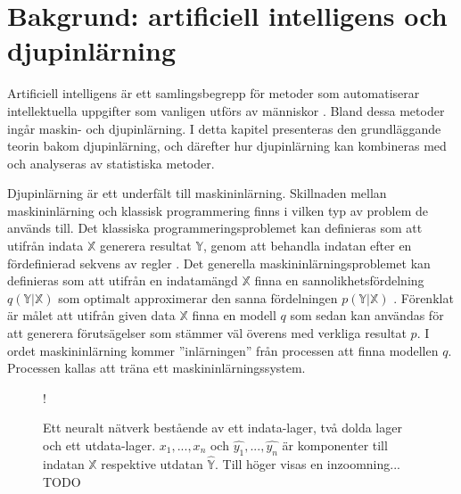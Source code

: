 

\section{Bakgrund: artificiell intelligens och djupinlärning}
\label{sec:DeepBack}

Artificiell intelligens är ett samlingsbegrepp för metoder som automatiserar intellektuella uppgifter som vanligen utförs av människor \cite{Chollet}. Bland dessa metoder ingår maskin- och djupinlärning. I detta kapitel presenteras den grundläggande teorin bakom djupinlärning, och därefter hur djupinlärning kan kombineras med och analyseras av statistiska metoder. 

Djupinlärning är ett underfält till maskininlärning. Skillnaden mellan maskininlärning och klassisk programmering finns i vilken typ av problem de används till. Det klassiska programmeringsproblemet kan definieras som att utifrån indata $\mathbb{X}$ generera resultat $\mathbb{Y}$, genom att behandla indatan efter en fördefinierad sekvens av regler \cite{JavaGroundUp}. Det generella maskininlärningsproblemet kan definieras som att utifrån en indatamängd $\mathbb{X}$ finna en sannolikhetsfördelning $q\left(\mathbb{Y}|\mathbb{X}\right)$ som optimalt approximerar den sanna fördelningen $p\left(\mathbb{Y}|\mathbb{X}\right)$ \cite{variation}. Förenklat är målet att utifrån given data $\mathbb{X}$ finna en modell $q$ som sedan kan användas för att generera förutsägelser som stämmer väl överens med verkliga resultat $p$. I ordet maskininlärning kommer ''inlärningen'' från processen att finna modellen $q$. Processen kallas att träna ett maskininlärningssystem.
\begin{figure}[hbtp]
    \centering
    \resizebox {0.7\textwidth} {!} {
        
    }
    \caption{Ett neuralt nätverk bestående av ett indata-lager, två dolda lager och ett utdata-lager. ${x_1,...,x_n}$ och ${\hat{y_1},...,\hat{y_n}}$ är komponenter till indatan $\mathbb{X}$ respektive utdatan $\mathbb{\hat{Y}}$. Till höger visas en inzoomning... TODO}
    \label{fig:general_NN}
\end{figure}

